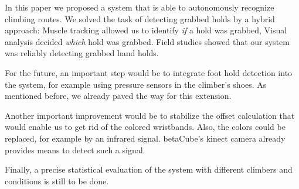 In this paper we proposed a system that is able to autonomously recognize climbing routes.
We solved the task of detecting grabbed holds by a hybrid approach:
Muscle tracking allowed us to identify \emph{if} a hold was grabbed, Visual analysis decided \emph{which} hold was grabbed.
Field studies showed that our system was reliably detecting grabbed hand holds.

For the future, an important step would be to integrate foot hold detection into the system, for example using pressure sensors in the climber's shoes.
As mentioned before, we already paved the way for this extension.

Another important improvement would be to stabilize the offset calculation that would enable us to get rid of the colored wristbands.
Also, the colors could be replaced, for example by an infrared signal.
betaCube's kinect camera already provides means to detect such a signal.

Finally, a precise statistical evaluation of the system with different climbers and conditions is still to be done.